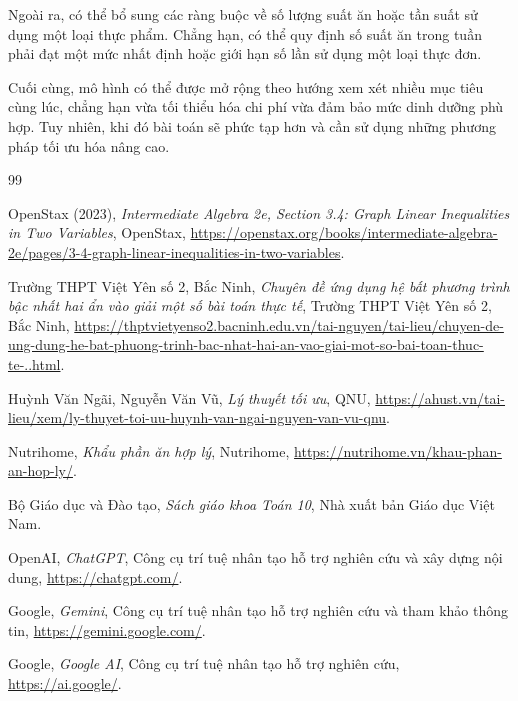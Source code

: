 \documentclass[12pt,a4paper]{article}
\begin{document}
Ngoài ra, có thể bổ sung các ràng buộc về số lượng suất ăn hoặc tần
suất sử dụng một loại thực phẩm. Chẳng hạn, có thể quy định số suất
ăn trong tuần phải đạt một mức nhất định hoặc giới hạn số lần sử dụng
một loại thực đơn.

Cuối cùng, mô hình có thể được mở rộng theo hướng xem xét nhiều mục
tiêu cùng lúc, chẳng hạn vừa tối thiểu hóa chi phí vừa đảm bảo mức
dinh dưỡng phù hợp. Tuy nhiên, khi đó bài toán sẽ phức tạp hơn và cần
sử dụng những phương pháp tối ưu hóa nâng cao.



\clearpage
{}

\begin{thebibliography}{99}

OpenStax (2023),
\textit{Intermediate Algebra 2e, Section 3.4: Graph Linear Inequalities in Two Variables},
OpenStax, 
\url{https://openstax.org/books/intermediate-algebra-2e/pages/3-4-graph-linear-inequalities-in-two-variables}.

Trường THPT Việt Yên số 2, Bắc Ninh,
\textit{Chuyên đề ứng dụng hệ bất phương trình bậc nhất hai ẩn vào giải một số bài toán thực tế},
Trường THPT Việt Yên số 2, Bắc Ninh,
\url{https://thptvietyenso2.bacninh.edu.vn/tai-nguyen/tai-lieu/chuyen-de-ung-dung-he-bat-phuong-trinh-bac-nhat-hai-an-vao-giai-mot-so-bai-toan-thuc-te-..html}.

Huỳnh Văn Ngãi, Nguyễn Văn Vũ,
\textit{Lý thuyết tối ưu},
QNU,
\url{https://ahust.vn/tai-lieu/xem/ly-thuyet-toi-uu-huynh-van-ngai-nguyen-van-vu-qnu}.

Nutrihome,
\textit{Khẩu phần ăn hợp lý},
Nutrihome,
\url{https://nutrihome.vn/khau-phan-an-hop-ly/}.

Bộ Giáo dục và Đào tạo,
\textit{Sách giáo khoa Toán 10},
Nhà xuất bản Giáo dục Việt Nam.

OpenAI,
\textit{ChatGPT},
Công cụ trí tuệ nhân tạo hỗ trợ nghiên cứu và xây dựng nội dung,
\url{https://chatgpt.com/}.

Google,
\textit{Gemini},
Công cụ trí tuệ nhân tạo hỗ trợ nghiên cứu và tham khảo thông tin,
\url{https://gemini.google.com/}.

Google,
\textit{Google AI},
Công cụ trí tuệ nhân tạo hỗ trợ nghiên cứu,
\url{https://ai.google/}.

\end{thebibliography}
\end{document}
